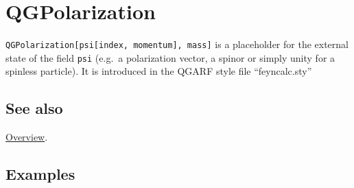 \documentclass[../FeynHelpersManual.tex]{subfiles}
\begin{document}
\hypertarget{qgpolarization}{
\section{QGPolarization}\label{qgpolarization}}

\texttt{QGPolarization[\allowbreak{}psi[\allowbreak{}index,\ \allowbreak{}momentum],\ \allowbreak{}mass]}
is a placeholder for the external state of the field \texttt{psi}
(e.g.~a polarization vector, a spinor or simply unity for a spinless
particle). It is introduced in the QGARF style file ``feyncalc.sty''

\subsection{See also}

\hyperlink{toc}{Overview}.

\subsection{Examples}
\end{document}
